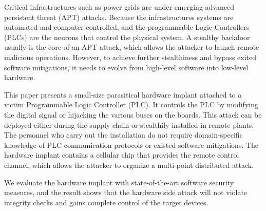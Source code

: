 
Critical infrastructures such as power grids are under emerging advanced persistent threat (APT) attacks. Because the infrastructures systems are automated and computer-controlled, and the programmable Logic Controllers (PLCs) are the neurons that control the physical system. A stealthy backdoor usually is the core of an APT attack, which allows the attacker to launch remote malicious operations. However, to achieve further stealthiness and bypass exited software mitigations, it needs to evolve from high-level software into low-level hardware.

This paper presents a small-size parasitical hardware implant attached to a victim Programmable Logic Controller (PLC). It controls the PLC by modifying the digital signal or hijacking the various buses on the boards. This attack can be deployed either during the supply chain or stealthily installed in remote plants. The personnel who carry out the installation do not require domain-specific knowledge of PLC communication protocols or existed software mitigations. The hardware implant contains a cellular chip that provides the remote control channel, which allows the attacker to organize a multi-point distributed attack.

We evaluate the hardware implant with state-of-the-art software security measures, and the result shows that the hardware side attack will not violate integrity checks and gains complete control of the target devices. 




